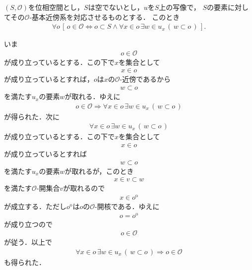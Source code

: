 	\begin{screen}
		\begin{thm}[基本近傍系による開集合の特徴づけ]
		\label{thm:local_base_defines_open_sets}
			$(S,\mathscr{O})$を位相空間とし，$S$は空でないとし，$u$を$S$上の写像で，
			$S$の要素に対してその$\mathscr{O}$-基本近傍系を対応させるものとする．
			このとき
			\begin{align}
				\forall o\, \left[\, o \in \mathscr{O} \Longleftrightarrow
				o \subset S \wedge \forall x \in o\, \exists w \in u_{x}\, (\, w \subset o\, )\, \right].
			\end{align}
		\end{thm}
	\end{screen}
	
	\begin{sketch}
		いま
		\begin{align}
			o \in \mathscr{O}
		\end{align}
		が成り立っているとする．この下で$x$を集合として
		\begin{align}
			x \in o
		\end{align}
		が成り立っているとすれば，$o$は$x$の$\mathscr{O}$-近傍であるから
		\begin{align}
			w \subset o
		\end{align}
		を満たす$u_{x}$の要素$w$が取れる．ゆえに
		\begin{align}
			o \in \mathscr{O} \Longrightarrow
			\forall x \in o\, \exists w \in u_{x}\, (\, w \subset o\, )
		\end{align}
		が得られた．次に
		\begin{align}
			\forall x \in o\, \exists w \in u_{x}\, (\, w \subset o\, )
		\end{align}
		が成り立っているとする．この下で$x$を集合として
		\begin{align}
			x \in o
		\end{align}
		が成り立っているとすれば
		\begin{align}
			w \subset o
		\end{align}
		を満たす$u_{x}$の要素$w$が取れるが，このとき
		\begin{align}
			x \in v \subset w
		\end{align}
		を満たす$\mathscr{O}$-開集合$v$が取れるので
		\begin{align}
			x \in o^{\mathrm{o}}
		\end{align}
		が成立する．ただし$o^{\mathrm{o}}$は$o$の$\mathscr{O}$-開核である．ゆえに
		\begin{align}
			o = o^{\mathrm{o}}
		\end{align}
		が成り立つので
		\begin{align}
			o \in \mathscr{O}
		\end{align}
		が従う．以上で
		\begin{align}
			\forall x \in o\, \exists w \in u_{x}\, (\, w \subset o\, )
			\Longrightarrow o \in \mathscr{O}
		\end{align}
		も得られた．
		\QED
	\end{sketch}
	
